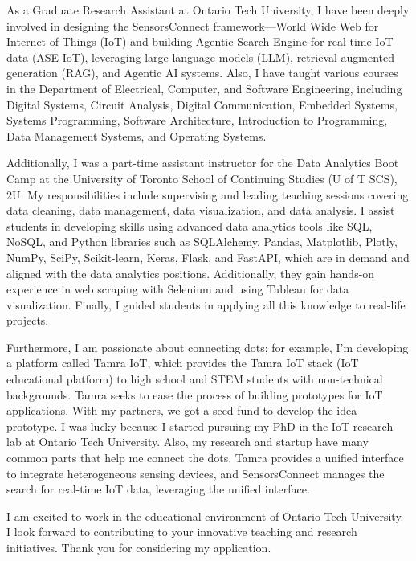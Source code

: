 \documentclass[10pt, letterpaper]{article}
\newcommand{\university }{Ontario Tech University}
\begin{document}
    As a Graduate Research Assistant at Ontario Tech University, I have been deeply involved in designing the SensorsConnect framework—World Wide Web for Internet of Things (IoT) and building Agentic Search Engine for real-time IoT data (ASE-IoT), leveraging large language models (LLM), retrieval-augmented generation (RAG), and Agentic AI systems. Also, I have taught various courses in the Department of Electrical, Computer, and Software Engineering, including Digital Systems, Circuit Analysis, Digital Communication, Embedded Systems, Systems Programming, Software Architecture, Introduction to Programming, Data Management Systems, and Operating Systems. \vspace{0.2cm}
    
    Additionally, I was a part-time assistant instructor for the Data Analytics Boot Camp at the University of Toronto School of Continuing Studies (U of T SCS), 2U. My responsibilities include supervising and leading teaching sessions covering data cleaning, data management, data visualization, and data analysis. I assist students in developing skills using advanced data analytics tools like SQL, NoSQL, and Python libraries such as SQLAlchemy, Pandas, Matplotlib, Plotly, NumPy, SciPy, Scikit-learn, Keras, Flask, and FastAPI, which are in demand and aligned with the data analytics positions. Additionally, they gain hands-on experience in web scraping with Selenium and using Tableau for data visualization. Finally, I guided students in applying all this knowledge to real-life projects. \vspace{0.2cm}
    
    Furthermore, I am passionate about connecting dots; for example, I'm developing a platform called Tamra IoT, which provides the Tamra IoT stack (IoT educational platform) to high school and STEM students with non-technical backgrounds. Tamra seeks to ease the process of building prototypes for IoT applications. With my partners, we got a seed fund to develop the idea prototype. I was lucky because I started pursuing my PhD in the IoT research lab at Ontario Tech University. Also, my research and startup have many common parts that help me connect the dots. Tamra provides a unified interface to integrate heterogeneous sensing devices, and SensorsConnect manages the search for real-time IoT data, leveraging the unified interface.\vspace{.2cm}
    
    I am excited to work in the educational environment of \university. I look forward to contributing to your innovative teaching and research initiatives. Thank you for considering my application. \vspace{.2cm}
    
\end{document}
